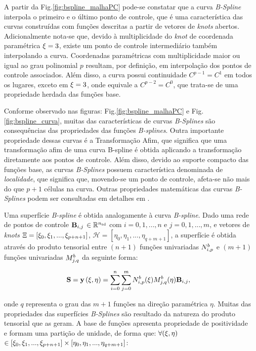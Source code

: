 \documentclass[tese_patricia]{subfiles}
\begin{document}
A partir da Fig.\ref{fig:bspline_malhaPC} pode-se constatar que a curva \textit{B-Spline} interpola o primeiro e o último ponto de controle, que é uma característica das curvas construídas com funções descritas a partir de vetores de \textit{knots} abertos. Adicionalmente nota-se que, devido à multiplicidade do \textit{knot} de coordenada paramétrica $\xi=3$, existe um ponto de controle intermediário também interpolando a curva. 
Coordenadas paramétricas com multiplicidade maior ou igual ao grau polinomial $p$ resultam, por definição, em interpolação dos pontos de controle associados.
Além disso, a curva possui continuidade $C^{p-1} = C^{1}$ em todos os lugares, exceto em $\xi = 3$, onde equivale a $C^{p-2} = C^{0}$, que trata-se de uma propriedade herdada das funções base.

Conforme observado nas figuras: Fig.\ref{fig:bspline_malhaPC} e Fig. \ref{fig:bspline_curva}, muitas das características de curvas \textit{B-Splines} são consequências das propriedades das funções \textit{B-splines}. Outra importante propriedade dessas curvas é a Transformação Afim, que significa que uma transformação afim de uma curva B-spline é obtida aplicando a transformação diretamente aos pontos de controle. Além disso, devido ao suporte compacto das funções base, as curvas \textit{B-Splines} possuem característica denominada de \textit{localidade}, que significa que, movendo-se um ponto de controle, afeta-se não mais do que $p+1$ células na curva. Outras propriedades matemáticas das curvas \textit{B-Splines} podem ser consultadas em detalhes em .

Uma superfície \textit{B-spline} é obtida analogamente à curva \textit{B-spline}. Dado uma rede de pontos de controle $\mathbf{B}_{i,j}$ $\in \mathbb{R}^{{n_{\mathrm{sd}}}}$ com $i = 0,1,...,n$ e $j = 0,1,..., m$, e vetores de \textit{knots} $\Xi = \left[\xi_{0},\xi_{1},...,\xi_{p+n+1}\right]$, $\mathcal{H} = \left[\eta_{0},\eta_{1},...,\eta_{q+m+1}\right]$, a superfície é obtida através do produto tensorial entre $(n+1)$ funções univariadas $N^b_{i,p}$ e $(m+1)$ funções univariadas $M^b_{j,q}$ da seguinte forma:

\begin{align}
\mathbf{S} = \mathbf{y}\left(\xi,\eta\right)  = \sum_{i=0}^{n}\sum_{j=0}^{m}N^b_{i,p}(\xi)M^b_{j,q}(\eta)\mathbf{B}_{i,j},
\end{align}

\noindent onde $q$ representa o grau das $m+1$ funções na direção paramétrica $\eta$. 
Muitas das propriedades das superfícies \textit{B-Splines} são resultado da natureza do produto tensorial que as geram. A base de funções apresenta propriedade de positividade e formam uma partição de unidade, de forma que: $\forall(\xi,\eta)$ $\in \left[\xi_{0},\xi_{1},...,\xi_{p+n+1}\right] \times  \left[\eta_{0},\eta_{1},...,\eta_{q+m+1}\right]$:
\end{document}

